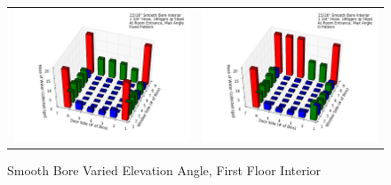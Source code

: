 \documentclass{article}
\begin{document}
\begin{appendices}
\begin{figure}[ht]
{\begin{tabular*}{\textwidth}{lr}
\includegraphics[width=3.2in]{../ADD_Analysis/Figures/15-12-09_145932_Datafile_15_16in_Smooth_Bore_Interior.png} &
\includegraphics[width=3.2in]{../ADD_Analysis/Figures/15-12-09_150300_Datafile_15_16in_Smooth_Bore_Interior.png} \\
\end{tabular*}}
\caption{Smooth Bore Varied Elevation Angle, First Floor Interior}
\label{fig:Smooth Bore Varied Elevation Angle, First Floor Interior}
\end{figure}

\clearpage


\end{appendices}
\end{document}
